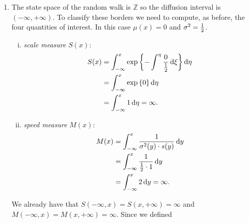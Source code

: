 \documentclass[12pt]{article}
\begin{document}
\begin{enumerate}
\begin{enumerate}[\circnum]
			\item continuity of paths: by Donsker's theorem\footcite[198]{rene} we know that, if the increments of the random walk have zero mean and finite variance, then 
			\begin{equation*}
				S^{\star}_{(n)}(t)\xrightarrow[n\to\infty]{d}B_{t}\qquad\every t\in(0,1].
			\end{equation*}
			This convergence gives pointwise but not uniform results: to get the latter, we need the \textit{invariance principle} by Donsker\footcite[199]{rene}: if $\Phi:\mathcal{C}([0,1],\R)\to\R$ (the space of continuous real-valued functions defined on $[0,1]$) is a uniformly continuous bounded functional then
			\begin{equation*}
				\lim_{n\to\infty}\ev\left[\Phi\left(S^{\star}_{(n)}(\cdot)\right)\right]=\ev\left[\Phi(B(\cdot))\right].
			\end{equation*}
			This implies that the limit process lives in $\mathcal{C}([0,1],\R)$ and therefore the limit (which is the Brownian motion) has continuous sample paths almost surely.
			\[
			S^{\star}_{(n)}(\cdot) \Rightarrow B(\cdot)
			\quad \text{in } \mathcal{C}([0,1], \mathbb{R}).
			\]
		\end{enumerate}
		\item The state space of the random walk is $\mathbb{Z}$ so the diffusion interval is $(-\infty,+\infty)$. To classify these borders we need to compute, as before, the four quantities of interest. In this case $\mu(x)=0$ and $\sigma^{2}=\frac{1}{2}$.
		\begin{enumerate}[i)]
			\item \textit{scale measure} $S(x)$:
			\begin{align*}
				S(x)&=\int^{x}_{-\infty}\exp\left\{-\int^{\eta}\frac{0}{\frac{1}{2}}\mathop{}\!\mathrm{d}\xi\right\}\mathop{}\!\mathrm{d}\eta\\
				&=\int^{x}_{-\infty}\exp\left\{0\right\}\mathop{}\!\mathrm{d}\eta\\
				&=\int^{x}_{-\infty}1\mathop{}\!\mathrm{d}\eta=\infty.
			\end{align*}
			\item \textit{speed measure} $M(x)$:
			\begin{align*}
				M(x)&=\int_{-\infty}^{x}\frac{1}{\sigma^{2}(y)\cdot s(y)}\mathop{}\!\mathrm{d} y\\
				&=\int_{-\infty}^{x}\frac{1}{\frac{1}{2}\cdot 1}\mathop{}\!\mathrm{d} y\\
				&=\int_{-\infty}^{x}2\mathop{}\!\mathrm{d} y=\infty.
			\end{align*}
		\end{enumerate}
		We already have that $S(-\infty,x)=S(x,+\infty)=\infty$ and $M(-\infty,x)=M(x,+\infty)=\infty$. Since we defined

\end{enumerate}
\end{document}
